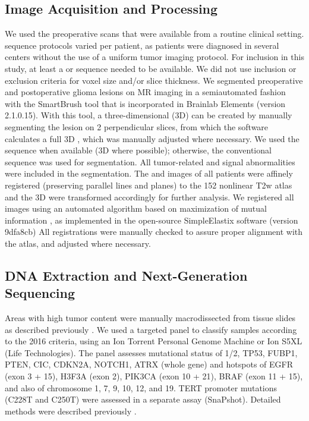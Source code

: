 \subsection{Image Acquisition and Processing}
We used the preoperative  scans that were available from a routine clinical setting.
 sequence protocols varied per patient, as patients were diagnosed in several centers without the use of a uniform tumor  imaging protocol.
For inclusion in this study, at least a  or  sequence needed to be available.
We did not use inclusion or exclusion criteria for voxel size and/or slice thickness.
We segmented preoperative and postoperative glioma lesions on MR imaging in a semiautomated fashion with the SmartBrush tool that is incorporated in Brainlab Elements (version 2.1.0.15).
With this tool, a three-dimensional (3D)  can be created by manually segmenting the lesion on 2 perpendicular slices, from which the software calculates a full 3D , which was manually adjusted where necessary.
We used the  sequence when available (3D where possible); otherwise, the conventional  sequence was used for segmentation.
All tumor-related  and  signal abnormalities were included in the segmentation.
The  and  images of all patients were affinely registered (preserving parallel lines and planes) to the   152 nonlinear T2w atlas \autocite{fonov2011unbiased, fonov2009unbiased} and the 3D  were transformed accordingly for further analysis.
We registered all  images using an automated algorithm based on maximization of mutual information \autocite{klein2009adaptive}, as implemented in the open-source SimpleElastix software (version 9dfa8cb) \autocite{marstal2016simpleelastix}
All registrations were manually checked to assure proper alignment with the atlas, and adjusted where necessary.

\subsection{DNA Extraction and Next-Generation Sequencing}

Areas with high tumor content were manually macrodissected from  tissue slides as described previously \autocite{wijnenga2017impact}.
We used a targeted  panel to classify samples according to the  2016 criteria, using an Ion Torrent Personal Genome Machine or Ion S5XL (Life Technologies).
The panel assesses mutational status of 1/2, TP53, FUBP1, PTEN, CIC, CDKN2A, NOTCH1, ATRX (whole gene) and hotspots of EGFR (exon 3 + 15), H3F3A (exon 2), PIK3CA (exon 10 + 21), BRAF (exon 11 + 15), and also  of chromosome 1, 7, 9, 10, 12, and 19.
TERT promoter mutations (C228T and C250T) were assessed in a separate assay (SnaPshot).
Detailed methods were described previously \autocite{wijnenga2017impact, wijnenga2018prognostic}.

